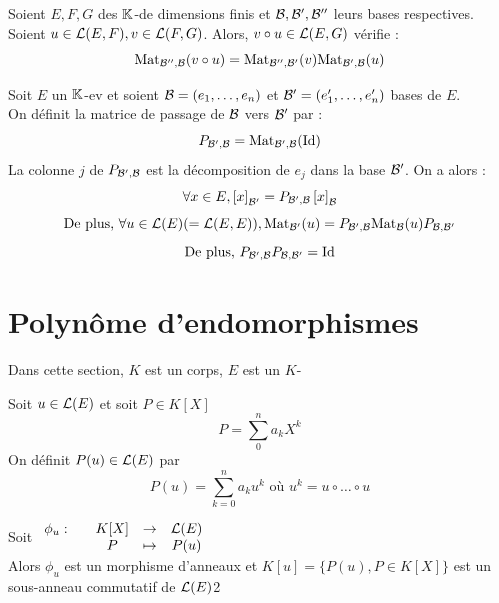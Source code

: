 \documentclass[]{report}
\begin{document}
    \begin{prop}{}{}
        Soient $E,F,G$ des $\mathbb{K}$-\evs de dimensions finis et $\mathcal{B},\mathcal{B}',\mathcal{B}''$ leurs bases respectives.\\
        Soient $u\in \mathcal{L}(E,F),v\in\mathcal{L}(F,G)$. Alors, $v\circ u \in \mathcal{L}(E,G)$ vérifie :
        \[\text{Mat}_{\mathcal{B}'',\mathcal{B}}(v\circ u)=\text{Mat}_{\mathcal{B}'',\mathcal{B}'}(v)\text{Mat}_{\mathcal{B}',\mathcal{B}}(u)\]
    \end{prop}

    \begin{df}{}{}
        Soit $E$ un $\mathbb{K}$-ev et soient $\mathcal{B}=(e_1,\ldots,e_n)$ et $\mathcal{B}'=(e_1',\ldots,e_n')$ bases de $E$.\\
        On définit la matrice de passage de $\mathcal{B}$ vers $\mathcal{B}'$ par :
        \[P_{\mathcal{B}',\mathcal{B}}=\text{Mat}_{\mathcal{B}',\mathcal{B}}(\text{Id})\]
        La colonne $j$ de $P_{\mathcal{B}',\mathcal{B}}$ est la décomposition de $e_j$ dans la base $\mathcal{B}'$. On a alors :
        \[\forall x\in E,\left[x \right]_{\mathcal{B}'}=P_{\mathcal{B}',\mathcal{B}}\left[x \right]_{\mathcal{B}}\]
        \[\text{De plus, }\forall u\in\mathcal{L}(E) (=\mathcal{L}(E,E)),\text{Mat}_{\mathcal{B}'}(u)=P_{\mathcal{B}',\mathcal{B}}\text{Mat}_{\mathcal{B}}(u)P_{\mathcal{B},\mathcal{B}'}\]
        \[\text{De plus, }P_{\mathcal{B}',\mathcal{B}}P_{\mathcal{B},\mathcal{B}'}=\text{Id}\]
    \end{df}

    \section{Polynôme d'endomorphismes}

    Dans cette section, $K$ est un corps, $E$ est un $K$-\ev

    \begin{df}{}{}
        Soit $u\in\mathcal{L}(E)$ et soit $P\in K[X]$
        \[P=\sum_{0}^{n} a_k X^k\]
        On définit $P(u)\in\mathcal{L}(E)$ par
        \[P(u)=\sum_{k=0}^n a_k u^k \text{ où $u^k=u\circ \ldots\circ u$}\]
    \end{df}

    \begin{lm}{}{}
        Soit $\begin{array}{ccccc} \phi_u : & & K[X] & \to & \mathcal{L}(E) \\ & & P & \mapsto & P(u) \end{array}$\\
        Alors $\phi_u$ est un morphisme d'anneaux et $K[u]=\{P(u),P\in K[X]\}$ est un sous-anneau commutatif de $\mathcal{L}(E)$2
    \end{lm}
\end{document}
